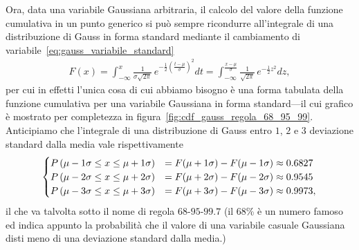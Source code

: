 Ora, data una variabile Gaussiana arbitraria, il calcolo del valore della
funzione cumulativa in un punto generico si può sempre ricondurre all'integrale di una distribuzione di Gauss in forma standard mediante il
cambiamento di variabile~\eqref{eq:gauss_variabile_standard}
\begin{align}\label{eq:gauss_funzione_cumulativa}
  F(x) = \int_{-\infty}^x \frac{1}{\sigma\sqrt{2\pi}} \,
  e^{-\frac{1}{2}\left(\frac{t-\mu}{\sigma}\right)^2} dt =
  \int_{-\infty}^{\frac{x - \mu}{\sigma}} \frac{1}{\sqrt{2\pi}}\,
  e^{-\frac{1}{2}z^2} dz,
\end{align}
per cui in effetti l'unica cosa di cui abbiamo bisogno è una forma tabulata
della funzione cumulativa per una variabile Gaussiana in forma standard---il
cui grafico è mostrato per completezza in
figura~\ref{fig:cdf_gauss_regola_68_95_99}.
Anticipiamo che l'integrale di una distribuzione di Gauss entro $1$, $2$ e
$3$ deviazione standard dalla media vale rispettivamente
\begin{align}\label{eq:65-95-99rule}
  \begin{cases}
    \displaystyle P\left(\mu - 1\sigma \leq x \leq \mu + 1\sigma\right) & =
    F(\mu + 1\sigma) - F(\mu - 1\sigma) \approx 0.6827\\
    \displaystyle P\left(\mu - 2\sigma \leq x \leq \mu + 2\sigma\right) & =
    F(\mu + 2\sigma) - F(\mu - 2\sigma) \approx 0.9545\\
    \displaystyle P\left(\mu - 3\sigma \leq x \leq \mu + 3\sigma\right) & =
    F(\mu + 3\sigma) - F(\mu - 3\sigma) \approx 0.9973,
  \end{cases}
\end{align}
il che va talvolta sotto il nome di regola $68$-$95$-$99.7$ (il 68\% è un
numero famoso ed indica appunto la probabilità che il valore di una variabile
casuale Gaussiana disti meno di una deviazione standard dalla media.)


